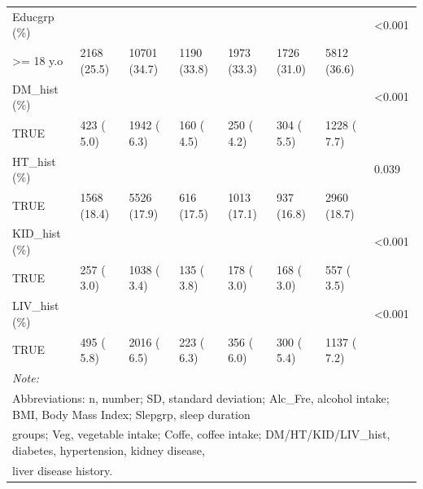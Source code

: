 \documentclass[]{tufte-handout}
\begin{document}
\begin{table}[ht]
\begin{tabular}[t]{llllllll}
Educgrp (\%) &  &  &  &  &  &  & <0.001\\
\rowcolor{gray!6}  \hspace{1em}>= 18 y.o & 2168 (25.5) & 10701 (34.7) & 1190 (33.8) & 1973 (33.3) & 1726 (31.0) & 5812 (36.6) & \\
DM\_hist (\%) &  &  &  &  &  &  & <0.001\\
\rowcolor{gray!6}  \hspace{1em}TRUE & 423 ( 5.0) & 1942 ( 6.3) & 160 ( 4.5) & 250 ( 4.2) & 304 ( 5.5) & 1228 ( 7.7) & \\
HT\_hist (\%) &  &  &  &  &  &  & 0.039\\
\rowcolor{gray!6}  \hspace{1em}TRUE & 1568 (18.4) & 5526 (17.9) & 616 (17.5) & 1013 (17.1) & 937 (16.8) & 2960 (18.7) & \\
KID\_hist (\%) &  &  &  &  &  &  & <0.001\\
\rowcolor{gray!6}  \hspace{1em}TRUE & 257 ( 3.0) & 1038 ( 3.4) & 135 ( 3.8) & 178 ( 3.0) & 168 ( 3.0) & 557 ( 3.5) & \\
LIV\_hist (\%) &  &  &  &  &  &  & <0.001\\
\rowcolor{gray!6}  \hspace{1em}TRUE & 495 ( 5.8) & 2016 ( 6.5) & 223 ( 6.3) & 356 ( 6.0) & 300 ( 5.4) & 1137 ( 7.2) & \\
\bottomrule
\multicolumn{8}{l}{\textit{Note: }}\\
\multicolumn{8}{l}{Abbreviations: n, number; SD, standard deviation; Alc\_Fre, alcohol intake; BMI, Body Mass Index; Slepgrp, sleep duration}\\
\multicolumn{8}{l}{groups; Veg, vegetable intake; Coffe, coffee intake; DM/HT/KID/LIV\_hist, diabetes, hypertension, kidney disease,}\\
\multicolumn{8}{l}{liver disease history.}\\
\end{tabular}
\end{table}

\newpage
\end{document}
